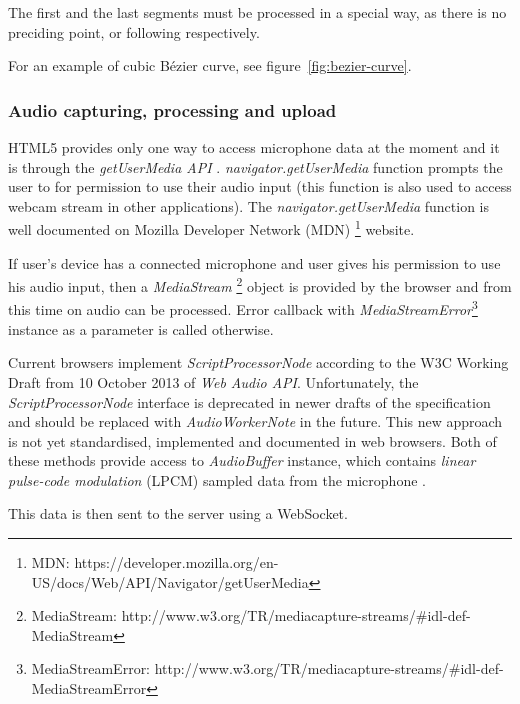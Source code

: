 The first and the last segments must be processed in a special way, as there is no preciding point, or following respectively. 

For an example of cubic Bézier curve, see figure~\ref{fig:bezier-curve}.



\subsubsection{Audio capturing, processing and upload}

HTML5 provides only one way to access microphone data at the moment and it is through the \textit{getUserMedia API} \cite{get_user_media}. \textit{navigator.getUserMedia} function prompts the user to for permission to use their audio input (this function is also used to access webcam stream in other applications). The \textit{navigator.getUserMedia} function is well documented on Mozilla Developer Network (MDN) \footnote{MDN: https://developer.mozilla.org/en-US/docs/Web/API/Navigator/getUserMedia} website.

If user's device has a connected microphone and user gives his permission to use his audio input, then a \textit{MediaStream} \footnote{MediaStream: http://www.w3.org/TR/mediacapture-streams/\#idl-def-MediaStream} object is provided by the browser and from this time on audio can be processed. Error callback with \textit{MediaStreamError}\footnote{MediaStreamError: http://www.w3.org/TR/mediacapture-streams/\#idl-def-MediaStreamError} instance as a parameter is called otherwise.

Current browsers implement \textit{ScriptProcessorNode} according to the W3C Working Draft from 10 October 2013 of \textit{Web Audio API}. Unfortunately, the \textit{ScriptProcessorNode} interface is deprecated in newer drafts of the specification and should be replaced with \textit{AudioWorkerNote} in the future\cite{mic_deprecated}. This new approach is not yet standardised, implemented and documented in web browsers. Both of these methods provide access to \textit{AudioBuffer} instance, which contains \textit{linear pulse-code modulation} (LPCM)\cite{wiki_pcm} sampled data from the microphone \cite{mic_pcm}.

This data is then sent to the server using a WebSocket. 


